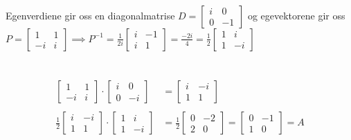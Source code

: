 \documentclass[11pt, a4paper, norsk]{article}
\begin{document}
\begin{Example}{}{}
            \\
            \\
            \\
            Egenverdiene gir oss en diagonalmatrise $D = \begin{bmatrix}
                i & 0 \\
                0 & -1
            \end{bmatrix}$ og egevektorene gir oss $P = \begin{bmatrix}
                1 & 1 \\
                -i & i
            \end{bmatrix} \implies P^{-1} = \frac{1}{2i} \begin{bmatrix}
                i & -1 \\
                i & 1
            \end{bmatrix} = \frac{-2i}{4} = \frac{1}{2} \begin{bmatrix}
                1 & i \\
                1 & -i
            \end{bmatrix}$ 
            \\
            \\
            \\
            \begin{align*}
                \begin{bmatrix}
                    1 & 1 \\
                    -i & i
                \end{bmatrix} \cdot \begin{bmatrix}
                    i & 0 \\
                    0 & -i
                \end{bmatrix} &= \begin{bmatrix}
                i & -i \\
                1 & 1
                \end{bmatrix}
                \\
                \\
               \frac{1}{2} \begin{bmatrix}
                   i & -i \\
                   1 & 1
               \end{bmatrix} \cdot \begin{bmatrix}
                   1 & i \\
                   1 & -i
               \end{bmatrix} &= \frac{1}{2} \begin{bmatrix}
               0 & -2 \\
               2 & 0
               \end{bmatrix} = \begin{bmatrix}
               0 & -1 \\
               1 & 0
               \end{bmatrix} = A
            \end{align*}
        \end{Example}
\end{document}
